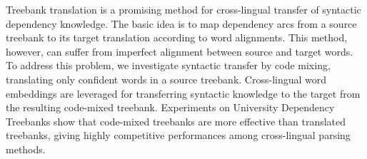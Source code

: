 Treebank translation is a promising method for cross-lingual transfer of syntactic dependency knowledge.
The basic idea is to map dependency arcs from a source treebank to its target translation according to word alignments.
This method, however, can suffer from imperfect alignment between source and target words.
To address this problem, we investigate syntactic transfer by code mixing, translating only confident words in a source treebank.
Cross-lingual word embeddings are leveraged for transferring syntactic knowledge to the target from the resulting code-mixed treebank.
Experiments on University Dependency Treebanks show that code-mixed treebanks are more effective than translated treebanks,
giving highly competitive performances among cross-lingual parsing methods.